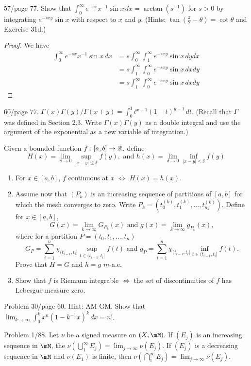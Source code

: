 \documentclass{article}
\begin{document}
 57/page 77. Show that $\int_0^\infty e^{-sx}x^{-1} \sin x \, dx = \arctan(s^{-1})$ for $s > 0$ by integrating $e^{-sxy}\sin x$ with respect to $x$ and $y$.  (Hints: $\tan(\frac \pi 2 - \theta) = \cot \theta$ and Exercise 31d.) %
\begin{proof}
We have 
\begin{align*}
\int_0^\infty  e^{-sx} x^{-1} \sin x \, dx & =  s \int_0^\infty \int_1^\infty e^{-sxy} \sin x \, dy dx 
\\ & =  s \int_1^\infty \int_0^\infty e^{-sxy} \sin x \, dx dy
\\ & =  s \int_1^\infty \int_0^\infty e^{-sxy} \sin x \, dx dy
\end{align*}
\end{proof}

 60/page 77. $\Gamma(x) \Gamma(y)/ \Gamma(x + y) = \int_0^1 t^{x-1}(1-t)^{y-1} \, dt$. (Recall that $\Gamma$ was defined in Section 2.3. Write $\Gamma(x) \Gamma(y)$ as a double integral and use the argument of the exponential as a new variable of integration.)

 Given a bounded function $f : [a,b] \to \mathbb{R}$, define
$$ H(x) = \lim_{\delta \to 0} \sup_{|x - y| \le \delta} f(y), \text{ and } h(x) = \lim_{\delta \to 0} \inf_{|x - y| \le \delta} f(y)$$
\begin{enumerate}[\bfseries a)]
\item For $x \in [a,b]$, $f$ continuous at $x$ $\iff$ $H(x) = h(x)$.
\item Assume now that $(P_k)$ is an increasing sequence of partitions of $[a,b]$ for which the mesh converges to zero. Write $P_k = (t_0^{(k)}, t_1^{(k)}, \ldots, t_{n_k}^{(k)})$. Define for $x \in [a,b]$,
$$G(x) = \lim_{k \to \infty} G_{P_k}(x) \text{ and } g(x) = \lim_{k \to \infty} g_{P_k}(x),$$
where for a partition $P = (t_0, t_1, \ldots, t_n)$
$$G_P = \sum_{i=1}^n \chi_{(t_{i-1}, t_i]} \sup_{t \in (t_{i-1}, t_i]} f(t) \text{ and } g_P = \sum_{i=1}^n \chi_{(t_{i-1}, t_i]} \inf_{t \in (t_{i-1}, t_i]} f(t).$$
Prove that $H = G$ and $h = g$ $m$-a.e.
\item Show that $f$ is Riemann integrable $\iff$ the set of discontinuities of $f$ has Lebesgue measure zero.
\end{enumerate}

 Problem 30/page 60. Hint: AM-GM. Show that $\lim_{k \to \infty} \int_0^k x^n (1 - k^{-1} x) ^k \, dx = n!$.

 Problem 1/88. Let $\nu$ be a signed measure on $(X, \mM)$. If $(E_j)$ is an increasing sequence in $\mM$, the $\nu(\bigcup_1^\infty E_j) = \lim_{j \to \infty} \nu(E_j)$. If $(E_j)$ is a decreasing sequence in $\mM$ and $\nu(E_1)$ is finite, then $\nu(\bigcap_1^\infty E_j) = \lim_{j \to \infty} \nu(E_j)$.
\end{document}
